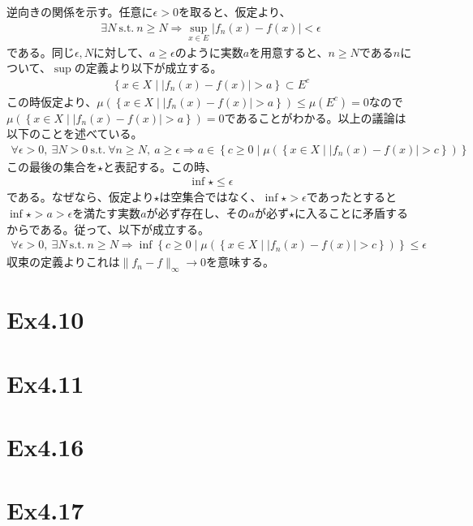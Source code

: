 \documentclass{article}
\begin{document}
逆向きの関係を示す。任意に$\epsilon > 0$を取ると、仮定より、
\begin{align*}
	\exists N\ \text{s.t.}\ n\geq N \Rightarrow \sup_{x\in E} |f_n(x) - f(x)| < \epsilon
\end{align*}
である。同じ$\epsilon,N$に対して、$a \geq \epsilon$のように実数$a$を用意すると、$n \geq N$である$n$について、$\sup$の定義より以下が成立する。
\begin{align*}
	\left\{ x\in X \mid |f_n(x) -f(x)| > a \right\} \subset E^c
\end{align*}
この時仮定より、$\mu(\left\{ x\in X \mid |f_n(x) -f(x)| > a \right\}) \leq \mu(E^c) = 0$なので$\mu(\left\{ x\in X \mid |f_n(x) -f(x)| > a \right\}) = 0$であることがわかる。以上の議論は以下のことを述べている。
\begin{align*}
	\forall \epsilon > 0,\ \exists N > 0\ \text{s.t.}\ \forall n \geq N,\ a \geq \epsilon \Rightarrow a \in \left\{ c \geq 0 \mid \mu\left( \left\{ x \in X \mid |f_n(x) - f(x)| > c \right\} \right) \right\}
\end{align*}
この最後の集合を$\star$と表記する。この時、
\begin{align*}
	\inf \star \leq \epsilon
\end{align*}
である。なぜなら、仮定より$\star$は空集合ではなく、$\inf \star > \epsilon$であったとすると$\inf \star > a > \epsilon$を満たす実数$a$が必ず存在し、その$a$が必ず$\star$に入ることに矛盾するからである。従って、以下が成立する。
\begin{align*}
	\forall \epsilon > 0,\ \exists N\ \text{s.t.}\ n\geq N \Rightarrow \inf \left\{ c \geq 0 \mid \mu\left( \left\{ x \in X \mid |f_n(x) - f(x)| > c \right\} \right) \right\} \leq \epsilon
\end{align*}
収束の定義よりこれは$\| f_n -f \|_{\infty} \to 0$を意味する。



\section{Ex4.10}



\section{Ex4.11}

\section{Ex4.16}

\section{Ex4.17}
\end{document}
